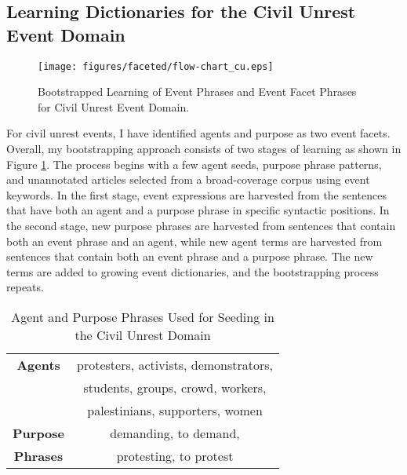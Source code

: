\subsection{Learning Dictionaries for the Civil Unrest Event Domain}

\begin{figure}[htbp]
 \centering
 \texttt{[image: figures/faceted/flow-chart\_cu.eps]}
 \caption{Bootstrapped Learning of Event Phrases and Event Facet Phrases for Civil Unrest Event Domain.}
\label{chap5:multi_faceted_flow_chart_cu}
\end{figure}

For civil unrest events, 
I have identified agents and purpose as two event facets.
Overall, my bootstrapping approach consists of two stages of learning as shown
in Figure \ref{chap5:multi_faceted_flow_chart_cu}.  The process begins with a few
agent seeds, purpose phrase patterns, and unannotated articles
selected from a broad-coverage corpus using event keywords.  In the
first stage, event expressions are harvested from the sentences that
have both an agent and a purpose phrase in specific syntactic
positions.
In the second stage, new purpose phrases are harvested from sentences that contain both an event phrase 
and an agent, while new agent terms are harvested from sentences that contain both an event phrase and a purpose phrase. 
The new terms are added to growing event dictionaries, and the 
bootstrapping process repeats. 

\begin{table}[htbp]
\small
\centering
\begin{tabular}[center]{|c|c|} \hline
{\bf Agents} & protesters, activists, demonstrators, \\
             & students, groups, crowd, workers, \\
             & palestinians, supporters, women  \\ \hline 
{\bf Purpose} & demanding, to demand, \\
{\bf Phrases}	& protesting, to protest \\ \hline

\end{tabular}
\caption{Agent and Purpose Phrases Used for Seeding in the Civil Unrest Domain}
\label{seed-table}
\end{table}

